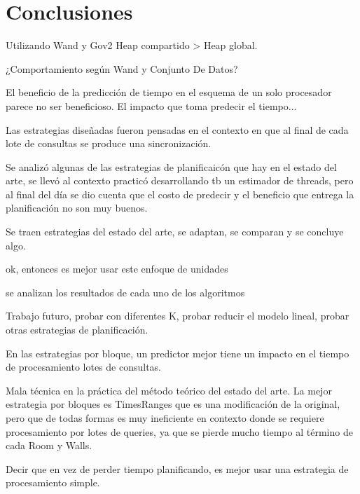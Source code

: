 \chapter{Conclusiones}
\label{cap:conclu}

Utilizando Wand y Gov2 Heap compartido > Heap global.

¿Comportamiento según Wand y Conjunto De Datos? 

El beneficio de la predicción de tiempo en el esquema de un solo procesador parece no ser beneficioso. 
El impacto que toma predecir el tiempo...

Las estrategias diseñadas fueron pensadas en el contexto en que al final de cada lote de consultas se produce una sincronización.

Se analizó algunas de las estrategias de planificaicón que hay en el estado del arte, se llevó al contexto practicó desarrollando tb un estimador de threads, pero al final del día se dio cuenta que el costo de predecir y el beneficio que entrega la planificación no son muy buenos.

Se traen estrategias del estado del arte, se adaptan, se comparan y se concluye algo.

ok, entonces es mejor usar este enfoque de unidades

se analizan los resultados de cada uno de los algoritmos

Trabajo futuro, probar con diferentes K, probar reducir el modelo lineal, probar otras estrategias de planificación.

En las estrategias por bloque, un predictor mejor tiene un impacto en el tiempo de procesamiento lotes de consultas.

Mala técnica en la práctica del método teórico del estado del arte. La mejor estrategia por bloques es TimesRanges que es una modificación de la original, pero que de todas formas es muy ineficiente en contexto donde se requiere procesamiento por lotes de queries, ya que se pierde mucho tiempo al término de cada Room y Walls. 

Decir que en vez de perder tiempo planificando, es mejor usar una estrategia de procesamiento simple. 